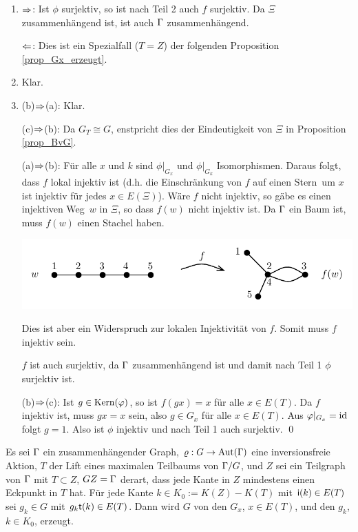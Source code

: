 \documentclass[a4paper, 12pt, twoside]{article}
\begin{document}
\bew \begin{enumerate}
\item \glqq$\Rightarrow$\grqq: Ist $\phi$ surjektiv, so ist nach Teil 2 auch
$f$ surjektiv. Da $\Xi$ zusammenhängend ist, ist auch $\Gamma$
zusammenhängend.

\glqq$\Leftarrow$\grqq: Dies ist ein Spezialfall ($T=Z$) der folgenden
Proposition \ref{prop_Gx_erzeugt}.
\item Klar.
\item
\glqq (b)$\Rightarrow$(a)\grqq: Klar.

\glqq (c)$\Rightarrow$(b)\grqq: Da $G_T\cong G$, enstpricht dies der 
Eindeutigkeit von $\Xi$ in Proposition \ref{prop_BvG}.

\glqq (a)$\Rightarrow$(b)\grqq: Für alle $x$ und $k$ sind
$\phi|_{G_x}$ und $\phi|_{G_k}$ Isomorphismen.
Daraus folgt, dass $f$ lokal injektiv ist (d.h. die Einschränkung
von $f$ auf einen \glqq Stern\grqq\ um $x$ ist injektiv für jedes
$x\in E(\Xi)$).
Wäre $f$ nicht injektiv, so gäbe es einen \glqq injektiven Weg\grqq\
$w$ in $\Xi$, so dass $f(w)$ nicht injektiv ist.
Da $\Gamma$ ein Baum ist, muss $f(w)$ einen Stachel haben.
\begin{center}
	\includegraphics{grugraImages/winjektiv}
\end{center}
Dies ist aber ein Widerspruch zur lokalen Injektivität von $f$.
Somit muss $f$ injektiv sein.

$f$ ist auch surjektiv, da $\Gamma$ zusammenhängend ist und damit nach
Teil 1 $\phi$ surjektiv ist.

\glqq (b)$\Rightarrow$(c)\grqq: Ist $g\in\mathrm{Kern}(\varphi)$, so ist $f(gx)=x$
für alle $x\in E(T)$. Da $f$ injektiv ist, muss $gx=x$ sein,
also $g\in G_x$ für alle $x\in E(T)$. Aus $\varphi|_{G_x}=\mathrm{id}$
folgt $g=1$. Also ist $\phi$ injektiv und nach Teil 1 auch
surjektiv.
\qed
\end{enumerate}

\PROP \label{prop_Gx_erzeugt}
Es sei $\Gamma$ ein zusammenhängender Graph, $\varrho:G\rightarrow\mathrm{Aut}(\Gamma)$
eine inversionsfreie Aktion, $T$ der Lift eines maximalen
Teilbaums von $\Gamma/G$, und $Z$ sei ein Teilgraph von $\Gamma$ mit
$T\subset Z$, $GZ=\Gamma$ derart, dass jede Kante in $Z$ mindestens
einen Eckpunkt in $T$ hat.
Für jede Kante $k\in K_0 := K(Z)-K(T)$ mit $\mathsf{i}(k)\in E(T)$
sei $g_k\in G$ mit $g_k \mathsf{t}(k)\in E(T)$.
Dann wird $G$ von den $G_x$, $x\in E(T)$, und den $g_k$, $k\in K_0$,
erzeugt.
\end{document}

